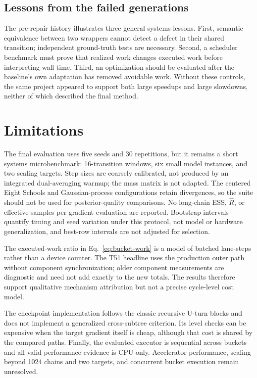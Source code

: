 \documentclass[conference]{IEEEtran}
\begin{document}
\subsection{Lessons from the failed generations}

The pre-repair history illustrates three general systems lessons.  First,
semantic equivalence between two wrappers cannot detect a defect in their
shared transition; independent ground-truth tests are necessary.  Second, a
scheduler benchmark must prove that realized work changes executed work before
interpreting wall time.  Third, an optimization should be evaluated after the
baseline's own adaptation has removed avoidable work.  Without these controls,
the same project appeared to support both large speedups and large slowdowns,
neither of which described the final method.

\section{Limitations}

The final evaluation uses five seeds and 30 repetitions, but it remains a short
systems microbenchmark: 16-transition windows, six small model instances, and
two scaling targets.  Step sizes are coarsely calibrated, not produced by an
integrated dual-averaging warmup; the mass matrix is not adapted.  The centered
Eight Schools and Gaussian-process configurations retain divergences, so the
suite should not be used for posterior-quality comparisons.  No long-chain ESS,
$\widehat R$, or effective samples per gradient evaluation are reported.
Bootstrap intervals quantify timing and seed variation under this protocol, not
model or hardware generalization, and best-row intervals are not adjusted for
selection.

The executed-work ratio in Eq.~\eqref{eq:bucket-work} is a model of batched
lane-steps rather than a device counter.  The T51 headline uses the production
outer path without component synchronization; older component measurements are
diagnostic and need not add exactly to the new totals.  The results therefore
support qualitative mechanism attribution but not a precise cycle-level cost
model.

The checkpoint implementation follows the classic recursive U-turn blocks and
does not implement a generalized cross-subtree criterion.  Its level checks can
be expensive when the target gradient itself is cheap, although that cost is
shared by the compared paths.  Finally, the evaluated executor is sequential
across buckets and all valid performance evidence is CPU-only.  Accelerator
performance, scaling beyond 1024 chains and two targets, and concurrent bucket
execution remain unresolved.
\end{document}
